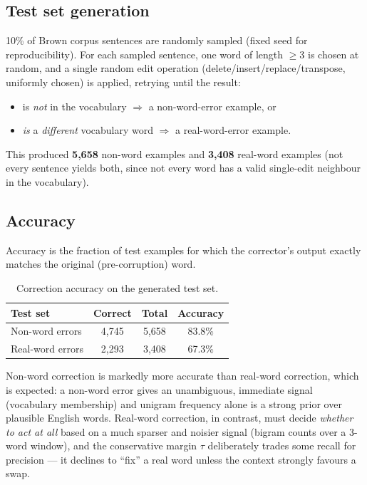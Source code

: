 \documentclass[11pt]{article}
\begin{document}
\subsection{Test set generation}

10\% of Brown corpus sentences are randomly sampled (fixed seed for reproducibility). For each sampled sentence, one word of length $\geq 3$ is chosen at random, and a single random edit operation (delete/insert/replace/transpose, uniformly chosen) is applied, retrying until the result:

\begin{itemize}
\item is \textit{not} in the vocabulary $\Rightarrow$ a non-word-error example, or
\item \textit{is} a \textit{different} vocabulary word $\Rightarrow$ a real-word-error example.
\end{itemize}

This produced \textbf{5,658} non-word examples and \textbf{3,408} real-word examples (not every sentence yields both, since not every word has a valid single-edit neighbour in the vocabulary).

\subsection{Accuracy}

Accuracy is the fraction of test examples for which the corrector's output exactly matches the original (pre-corruption) word.

\begin{table}[H]
\centering
\begin{tabular}{lccc}
\toprule
\textbf{Test set} & \textbf{Correct} & \textbf{Total} & \textbf{Accuracy} \\
\midrule
Non-word errors & 4,745 & 5,658 & 83.8\% \\
Real-word errors & 2,293 & 3,408 & 67.3\% \\
\bottomrule
\end{tabular}
\caption{Correction accuracy on the generated test set.}
\label{tab:accuracy}
\end{table}

Non-word correction is markedly more accurate than real-word correction, which is expected: a non-word error gives an unambiguous, immediate signal (vocabulary membership) and unigram frequency alone is a strong prior over plausible English words. Real-word correction, in contrast, must decide \textit{whether to act at all} based on a much sparser and noisier signal (bigram counts over a 3-word window), and the conservative margin $\tau$ deliberately trades some recall for precision --- it declines to ``fix'' a real word unless the context strongly favours a swap.
\end{document}
